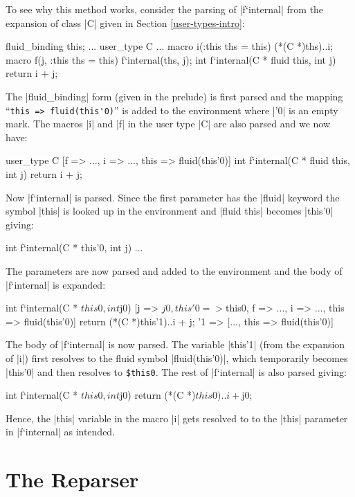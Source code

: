 To see why this method works, consider the parsing of |f`internal| from
the expansion of class |C| given in Section \ref{user-types-intro}:
\begin{code}
fluid_binding this;
...
user_type C {
  ...
  macro i(:this ths = this) {(*(C *)ths)..i;}
  macro f(j, :this ths = this) {f`internal(ths, j);}
  int f`internal(C * fluid this, int j) {return i + j;}
}
\end{code}

The |fluid_binding| form (given in the prelude) is first parsed and the
mapping ``\verb|this => fluid(this'0)|'' is added to the environment
where |'0| is an empty mark.  The macros |i| and |f| in the user type
|C| are also parsed and we now have:
\begin{code}
user_type C {
  [f => ..., i => ..., this => fluid(this'0)]
  int f`internal(C * fluid this, int j) {return i + j;}
}
\end{code}
Now |f`internal| is parsed.  Since the first parameter has the |fluid|
keyword the symbol |this| is looked up in the environment and
|fluid this| becomes |this'0| giving:%
\begin{code}
int f`internal(C * this'0, int j) {...}
\end{code}
The parameters are now parsed and added to the environment and the body of
|f`internal| is expanded:
\begin{code}
int f`internal(C * $this0, int $j0) {
  [j => $j0, this'0 => $this0, f => ..., i => ..., this => fluid(this'0)]
  return (*(C *)this'1)..i + j;
}
'1 => [..., this => fluid(this'0)]
\end{code}

The body of |f`internal| is now parsed.  The variable |this'1| (from
the expansion of |i|) first resolves to the fluid symbol
|fluid(this'0)|, which temporarily becomes |this'0| and then resolves to
\verb|$this0|.  The rest of |f`internal| is also parsed giving:
\begin{code}
int f`internal(C * $this0, int $j0) {
  return (*(C *)$this0)..i + $j0;
}
\end{code}

Hence, the |this| variable in the macro |i| gets resolved to to the
|this| parameter in |f`internal| as intended.

\section{The Reparser}
\label{reparser}

